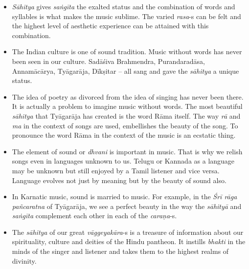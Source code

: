 \begin{itemize}
\itemsep=0pt

 \item \textit{Sāhitya} gives \textit{saṅgīta} the exalted status and the combination of words and syllables is what makes the music sublime. The varied \textit{rasa}-s can be felt and the highest level of aesthetic experience can be attained with this combination.

 \item The Indian culture is one of sound tradition. Music without words has never been seen in our culture. Sadāśiva Brahmendra, Purandaradāsa, Annamācārya, Tyāgarāja, Dīkṣitar – all sang and gave the \textit{sāhitya} a unique status. 

 \item The idea of poetry as divorced from the idea of singing has never been there. It is actually a problem to imagine music without words. The most beautiful \textit{sāhitya} that Tyāgarāja has created is the word Rāma itself. The way \textit{rā} and \textit{ma} in the context of songs are used, embellishes the beauty of the song. To pronounce the word Rāma in the context of the music is an ecstatic thing.

 \item The element of sound or \textit{dhvani} is important in music. That is why we relish songs even in languages unknown to us. Telugu or Kannada as a language may be unknown but still enjoyed by a Tamil listener and vice versa. Language evolves not just by meaning but by the beauty of sound also. 

 \item In Karnatic music, sound is married to music. For example, in the \textit{Śrī rāga pañcaratna} of Tyāgarāja, we see a perfect beauty in the way the \textit{sāhityā} and \textit{saṅgīta} complement each other in each of the \textit{caraṇa}-s.

 \item The \textit{sāhitya} of our great \textit{vāggeyakāra}-s is a treasure of information about our spirituality, culture and deities of the Hindu pantheon. It instills \textit{bhakti} in the minds of the singer and listener and takes them to the highest realms of divinity.

\end{itemize}

